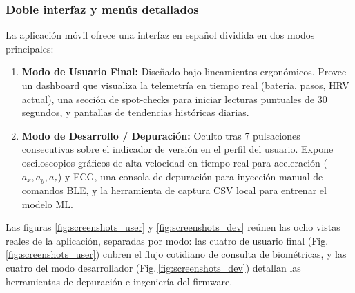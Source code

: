 \documentclass[letterpaper,11pt]{article}
\newcommand{\rfigura}[1]{Fig.\,\ref{#1}}
\begin{document}
\subsubsection{Doble interfaz y menús detallados}

La aplicación móvil ofrece una interfaz en español dividida en dos modos principales:
\begin{enumerate}
    \item \textbf{Modo de Usuario Final:} Diseñado bajo lineamientos ergonómicos. Provee un dashboard que visualiza la telemetría en tiempo real (batería, pasos, HRV actual), una sección de spot-checks para iniciar lecturas puntuales de 30 segundos, y pantallas de tendencias históricas diarias.
    \item \textbf{Modo de Desarrollo / Depuración:} Oculto tras 7 pulsaciones consecutivas sobre el indicador de versión en el perfil del usuario. Expone osciloscopios gráficos de alta velocidad en tiempo real para aceleración ($a_x, a_y, a_z$) y ECG, una consola de depuración para inyección manual de comandos BLE, y la herramienta de captura CSV local para entrenar el modelo ML.
\end{enumerate}

Las figuras \ref{fig:screenshots_user} y \ref{fig:screenshots_dev} reúnen las ocho vistas reales de la aplicación, separadas por modo: las cuatro de usuario final (\rfigura{fig:screenshots_user}) cubren el flujo cotidiano de consulta de biométricas, y las cuatro del modo desarrollador (\rfigura{fig:screenshots_dev}) detallan las herramientas de depuración e ingeniería del firmware.
\end{document}
